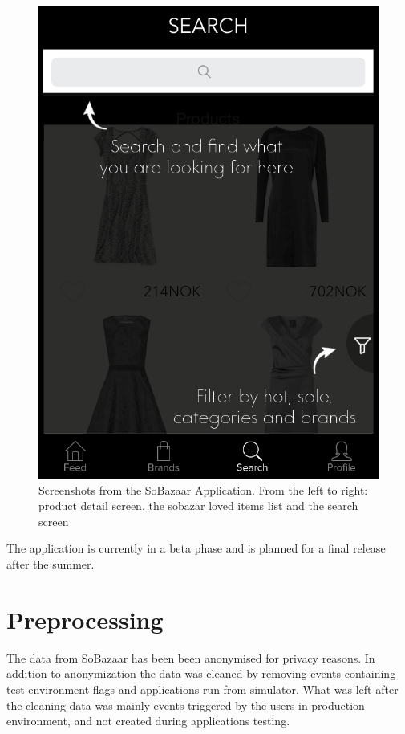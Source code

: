 \begin{figure}[H]
\begin{minipage}{.3\linewidth}
				  \includegraphics[height=1.5\linewidth]{image/SoBazaarsearch.png}
			\end{minipage}
			\caption[SoBazaar functionality screenshots - version 0.5.1]{Screenshots from the SoBazaar Application. From the left to right: product detail screen, the sobazar loved items list and the search screen}
			\label{figure:SoBazaarfeed}
	\end{figure}
	
	The application is currently in a beta phase and is planned for a final release after the summer.

\section{Preprocessing}
    \label{sec:preprocessing}
    The data from SoBazaar has been been anonymised for privacy reasons.
    In addition to anonymization the data was cleaned by removing events containing test environment flags and applications run from simulator.
    What was left after the cleaning data was mainly events triggered by the users in production environment, and not created during applications testing.

